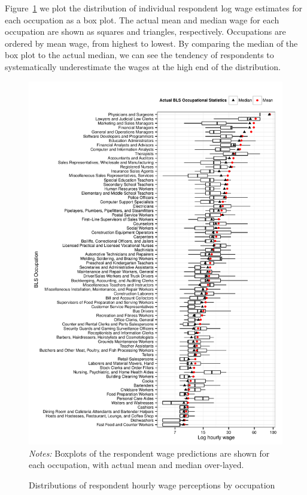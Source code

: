 \documentclass[12pt]{article}
\begin{document}
Figure~\ref{fig:by_occupation_boxplots} we plot the distribution of individual respondent log wage estimates for each occupation as a box plot. 
The actual mean and median wage for each occupation are shown as squares and triangles, respectively. 
Occupations are ordered by mean wage, from highest to lowest. 
By comparing the median of the box plot to the actual median, we can see the tendency of respondents to systematically underestimate the wages at the high end of the distribution. 

\begin{figure}
\caption{Distributions of respondent hourly wage perceptions by occupation \label{fig:by_occupation_boxplots}} 
\centering 
\begin{minipage}{0.90\linewidth}
\includegraphics[width = \linewidth]{./plots/box_plots_by_occupation.pdf} 
\emph{Notes:} Boxplots of the respondent wage predictions are shown for each occupation, with actual mean and median over-layed.
\end{minipage}
\end{figure} 
\end{document}
